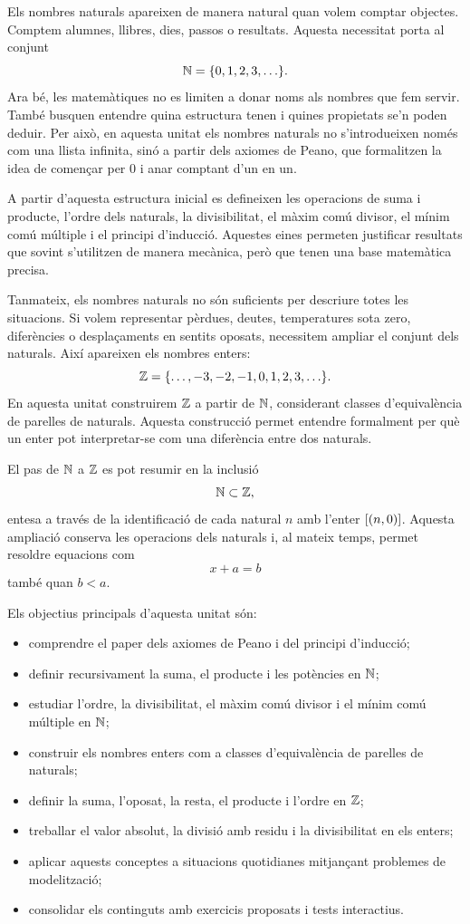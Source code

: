 \documentclass[12pt,a4paper,oneside]{book}
\begin{document}
Els nombres naturals apareixen de manera natural quan volem comptar objectes. Comptem alumnes, llibres, dies, passos o resultats. Aquesta necessitat porta al conjunt
\[
\mathbb{N}=\{0,1,2,3,\ldots\}.
\]
Ara bé, les matemàtiques no es limiten a donar noms als nombres que fem servir. També busquen entendre quina estructura tenen i quines propietats se'n poden deduir. Per això, en aquesta unitat els nombres naturals no s'introdueixen només com una llista infinita, sinó a partir dels axiomes de Peano, que formalitzen la idea de començar per \(0\) i anar comptant d'un en un.

A partir d'aquesta estructura inicial es defineixen les operacions de suma i producte, l'ordre dels naturals, la divisibilitat, el màxim comú divisor, el mínim comú múltiple i el principi d'inducció. Aquestes eines permeten justificar resultats que sovint s'utilitzen de manera mecànica, però que tenen una base matemàtica precisa.

Tanmateix, els nombres naturals no són suficients per descriure totes les situacions. Si volem representar pèrdues, deutes, temperatures sota zero, diferències o desplaçaments en sentits oposats, necessitem ampliar el conjunt dels naturals. Així apareixen els nombres enters:
\[
\mathbb{Z}=\{\ldots,-3,-2,-1,0,1,2,3,\ldots\}.
\]
En aquesta unitat construirem \(\mathbb{Z}\) a partir de \(\mathbb{N}\), considerant classes d'equivalència de parelles de naturals. Aquesta construcció permet entendre formalment per què un enter pot interpretar-se com una diferència entre dos naturals.

El pas de \(\mathbb{N}\) a \(\mathbb{Z}\) es pot resumir en la inclusió
\[
\mathbb{N}\subset \mathbb{Z},
\]
entesa a través de la identificació de cada natural \(n\) amb l'enter \(\left[(n,0)\right]\). Aquesta ampliació conserva les operacions dels naturals i, al mateix temps, permet resoldre equacions com
\[
x+a=b
\]
també quan \(b<a\).

Els objectius principals d'aquesta unitat són:
\begin{itemize}
\item comprendre el paper dels axiomes de Peano i del principi d'inducció;
\item definir recursivament la suma, el producte i les potències en \(\mathbb{N}\);
\item estudiar l'ordre, la divisibilitat, el màxim comú divisor i el mínim comú múltiple en \(\mathbb{N}\);
\item construir els nombres enters com a classes d'equivalència de parelles de naturals;
\item definir la suma, l'oposat, la resta, el producte i l'ordre en \(\mathbb{Z}\);
\item treballar el valor absolut, la divisió amb residu i la divisibilitat en els enters;
\item aplicar aquests conceptes a situacions quotidianes mitjançant problemes de modelització;
\item consolidar els continguts amb exercicis proposats i tests interactius.
\end{itemize}
\end{document}
